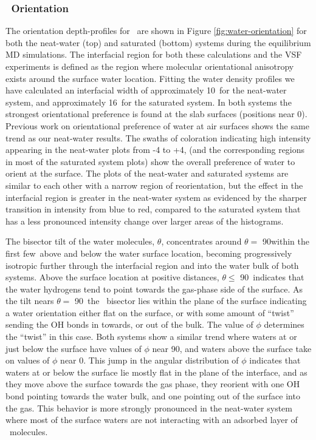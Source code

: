 \subsubsection{\wat~Orientation}

The orientation depth-profiles for \wat~are shown in Figure \ref{fig:water-orientation} for both the neat-water (top) and saturated (bottom) systems during the equilibrium MD simulations. The interfacial region for both these calculations and the VSF experiments is defined as the region where molecular orientational anisotropy exists around the surface water location. Fitting the water density profiles we have calculated an interfacial width of approximately 10\angs~for the neat-water system, and approximately 16\angs~for the saturated system. In both systems the strongest orientational preference is found at the slab surfaces (positions near 0\angs). Previous work on orientational preference of water at air surfaces shows the same trend as our neat-water results.\cite{Walker2006b,Hore2008} The swaths of coloration indicating high intensity appearing in the neat-water plots from -4 to +4\angs, (and the corresponding regions in most of the saturated system plots) show the overall preference of water to orient at the surface. The plots of the neat-water and saturated systems are similar to each other with a narrow region of reorientation, but the effect in the interfacial region is greater in the neat-water system as evidenced by the sharper transition in intensity from blue to red, compared to the saturated system that has a less pronounced intensity change over larger areas of the histograms.

The bisector tilt of the water molecules, $\theta$, concentrates around $\theta=$ 90\textdegree within the first few\angs~above and below the water surface location, becoming progressively isotropic further through the interfacial region and into the water bulk of both systems. Above the surface location at positive distances, $\theta \leq$ 90\textdegree~indicates that the water hydrogens tend to point towards the gas-phase side of the surface. As the tilt nears $\theta=$ 90\textdegree~the \wat~bisector lies within the plane of the surface indicating a water orientation either flat on the surface, or with some amount of ``twist'' sending the OH bonds in towards, or out of the bulk. The value of $\phi$ determines the ``twist'' in this case. Both systems show a similar trend where waters at or just below the surface have values of $\phi$ near 90\textdegree, and waters above the surface take on values of $\phi$ near 0\textdegree. This jump in the angular distribution of $\phi$ indicates that waters at or below the surface lie mostly flat in the plane of the interface, and as they move above the surface towards the gas phase, they reorient with one OH bond pointing towards the water bulk, and one pointing out of the surface into the gas. This behavior is more strongly pronounced in the neat-water system where most of the surface waters are not interacting with an adsorbed layer of \suldiox~molecules.


